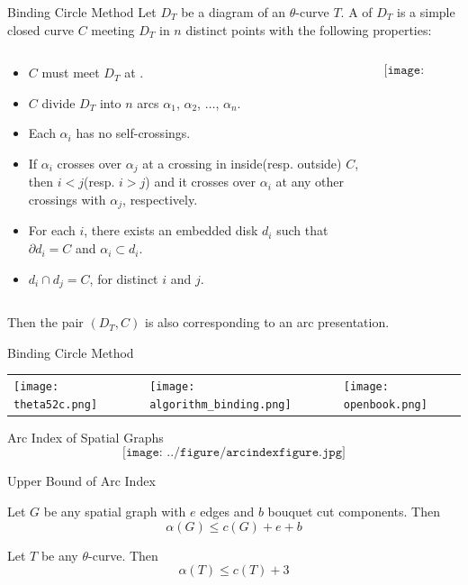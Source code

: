 \begin{frame}{Binding Circle Method}
	Let $D_T$ be a diagram of an $\theta$-curve $T$.
	A  of $D_T$ is a simple closed curve $C$ meeting $D_T$
	in $n$ distinct points with the following properties:
	\begin{columns}
		\begin{column}{.7\textwidth}
			\begin{itemize}
				\item $C$ must meet $D_T$ at .
				\item $C$ divide $D_T$ into $n$ arcs $\alpha_1$, $\alpha_2$, $\ldots$, $\alpha_n$.
				\item Each $\alpha_i$ has no self-crossings.
				\item If $\alpha_i$ crosses over $\alpha_j$ at a crossing in inside(resp. outside) $C$,
				then $i < j$(resp. $i > j$) and it crosses over $\alpha_i$ at any other crossings with $\alpha_j$, respectively.
				\item For each $i$, there exists an embedded disk $d_i$ such that $\partial d_i = C$ and $\alpha_i \subset d_i$.
				\item $d_i \cap d_j = C$, for distinct $i$ and $j$.
			\end{itemize}
		\end{column}

		\begin{column}{.3\textwidth}
			$$\texttt{[image: algorithm\_binding.png]}$$			
		\end{column}
	\end{columns}
	Then the pair $(D_T, C)$ is also corresponding to an arc presentation.
\end{frame}


\begin{frame}{Binding Circle Method}
	\begin{tabu}{X[5c]X[c]X[5c]X[c]X[5c]}
		\texttt{[image: theta52c.png]} & \raisebox{1.5cm}{$\longrightarrow$} & \texttt{[image: algorithm\_binding.png]} & \raisebox{1.5cm}{$\longleftrightarrow$} & \texttt{[image: openbook.png]}
	\end{tabu}
\end{frame}

\begin{frame}{Arc Index of Spatial Graphs}
	$$\texttt{[image: ../figure/arcindexfigure.jpg]}$$
\end{frame}


\begin{frame}{Upper Bound of Arc Index}

	\begin{thm}
		Let $G$ be any spatial graph with $e$ edges and $b$ bouquet cut components.
		Then
		\[
			\alpha(G) \le c(G) + e + b
		\]
	\end{thm}

	\begin{cor}
		Let $T$ be any $\theta$-curve.
		Then
		\[
			\alpha(T) \le c(T) + 3
		\]
	\end{cor}
\end{frame}
